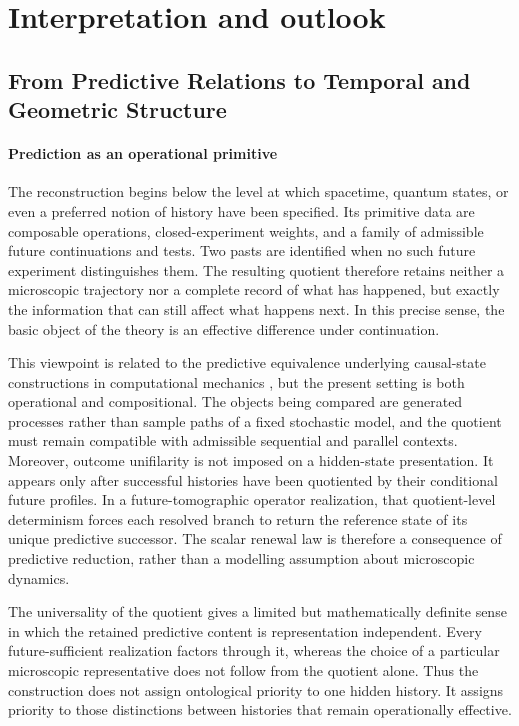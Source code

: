 \documentclass[11pt]{article}
\theoremstyle{definition}
\theoremstyle{remark}
\begin{document}
\section{Interpretation and outlook}
\label{sec:interpretation}

\subsection{From Predictive Relations to Temporal and Geometric Structure}
\label{subsec:intepretation}

\paragraph{Prediction as an operational primitive} The reconstruction begins below the level at which spacetime, quantum states,
or even a preferred notion of history have been specified.  Its primitive data
are composable operations, closed-experiment weights, and a family of
admissible future continuations and tests.  Two pasts are identified when no
such future experiment distinguishes them.  The resulting quotient therefore
retains neither a microscopic trajectory nor a complete record of what has
happened, but exactly the information that can still affect what happens next.
In this precise sense, the basic object of the theory is an effective
difference under continuation.

This viewpoint is related to the predictive equivalence underlying causal-state
constructions in computational mechanics
\cite{CrutchfieldYoung1989,ShaliziCrutchfield2001}, but the present setting is
both operational and compositional.  The objects being compared are generated
processes rather than sample paths of a fixed stochastic model, and the quotient
must remain compatible with admissible sequential and parallel contexts.
Moreover, outcome unifilarity is not imposed on a hidden-state presentation.
It appears only after successful histories have been quotiented by their
conditional future profiles.  In a future-tomographic operator realization,
that quotient-level determinism forces each resolved branch to return the
reference state of its unique predictive successor.  The scalar renewal law is
therefore a consequence of predictive reduction, rather than a modelling
assumption about microscopic dynamics.

The universality of the quotient gives a limited but mathematically definite
sense in which the retained predictive content is representation independent.
Every future-sufficient realization factors through it, whereas the choice of a
particular microscopic representative does not follow from the quotient alone.
Thus the construction does not assign ontological priority to one hidden
history.  It assigns priority to those distinctions between histories that
remain operationally effective.
\end{document}
